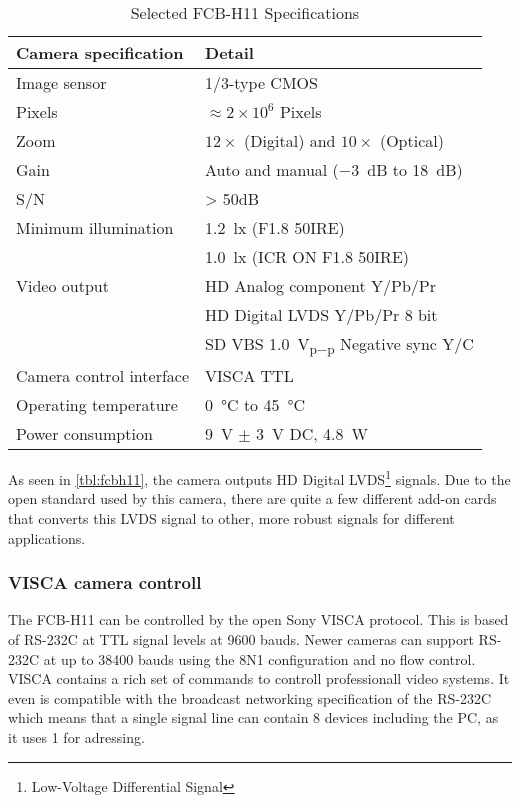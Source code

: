 \begin{table}[htbp]
	\centering
	\begin{tabular}{ll}
	
		\toprule
			Camera specification 	& Detail \\
		\midrule
			Image sensor 			& 1/3-type CMOS \\
			Pixels 					& $\approx2\times10^{6}$ Pixels \\
			Zoom 					& $12\times$ (Digital) and $10\times$ (Optical) \\
			Gain 					& Auto and manual (\SI{-3}{\deci\bel} to \SI{18}{\deci\bel}) \\
			S/N						& > 50dB \\
			Minimum illumination 	& \SI{1.2}{\lux} (F1.8 50IRE) \\
									& \SI{1.0}{\lux} (ICR ON F1.8 50IRE) \\
			Video output			& HD Analog component Y/Pb/Pr \\
									& HD Digital LVDS Y/Pb/Pr 8 bit \\
									& SD VBS \SI{1.0}{\volt_{p-p}} Negative sync Y/C \\
			Camera control interface& VISCA TTL \\
			Operating temperature	& \SI{0}{\celsius} to \SI{45}{\celsius} \\
			Power consumption		& \SI{9}{\volt} $\pm$ \SI{3}{\volt} DC, \SI{4.8}{\watt} \\
		\bottomrule
	\end{tabular}
	\caption{Selected FCB-H11 Specifications}
	\label{tbl:fcbh11}
\end{table}


As seen in \vref{tbl:fcbh11}, the camera outputs HD Digital LVDS\footnote{Low-Voltage Differential Signal} signals.
Due to the open standard used by this camera, there are quite a few different add-on cards that 
converts this LVDS signal to other, more robust signals for different applications.

\subsubsection{VISCA camera controll}\label{sec:visca}
The FCB-H11 can be controlled by the open Sony VISCA protocol. This is based of RS-232C at TTL signal levels
at 9600 bauds. Newer cameras can support RS-232C at up to 38400 bauds using the 8N1 configuration and no flow control. 
VISCA contains a rich set of commands to controll professionall video systems. It even is compatible with 
the broadcast networking specification of the RS-232C which means that a single signal line can contain 
8 devices including the PC, as it uses \SI{1}{\byte} for adressing.

